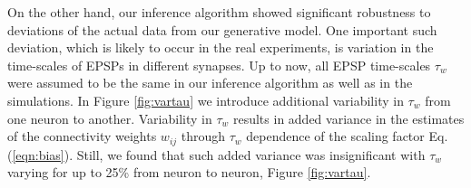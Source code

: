 %
%




On the other hand, our inference algorithm showed significant robustness to deviations of the actual data from our generative model.
One important such deviation, which is likely to occur in the real experiments, is variation in the time-scales of EPSPs in different synapses. Up to now, all EPSP time-scales $\tau_w$ were assumed to be the same in our inference algorithm as well as in the simulations.
In Figure \ref{fig:vartau} we introduce additional variability in $\tau_w$ from one neuron to another.
Variability in $\tau_w$ results in added variance in the estimates of the connectivity weights $w_{ij}$ through $\tau_w$ dependence of the scaling factor Eq.(\ref{eqn:bias}).
Still, we found that such added variance was insignificant with $\tau_w$ varying for up to 25\% from neuron to neuron, Figure \ref{fig:vartau}.


